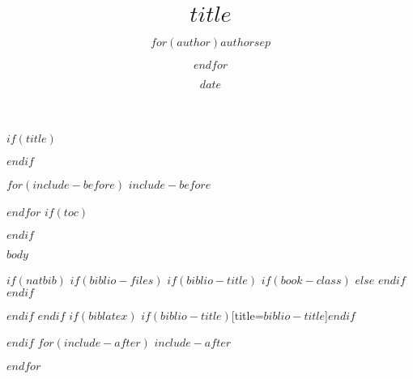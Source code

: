 \documentclass[fontsize=12pt,$if(fontsize)$$fontsize$,$endif$$if(lang)$$lang$,$endif$]{scrreprt}
\title{$title$}
\author{$for(author)$$author$$sep$ \and $endfor$}
\date{$date$}
\begin{document}
$if(title)$
\maketitle
$endif$

$for(include-before)$
$include-before$

$endfor$
$if(toc)$
{
\hypersetup{linkcolor=black}
\tableofcontents
\listoffigures 
\listoftables 
}
$endif$

\nocite{Barrie2007, Beer1998, Blyton2009, Boie2006,Brezina2008,Brezina2010,Brezina2010a}
\nocite{Collodi2010,Dietl2009,Dittert2012,Finsterbusch2012,Funke2008,Kinney2012,Klein2011}
\nocite{KNISTER1999,Leope2008,Lindgren1986,Maar2011,Masannek2003,Noestlinger2011,Noestlinger2010}
\nocite{Osborne2007,Pfister2011,Preussler2005,Preussler2005a,Rowling1998,Scheffler2011}
\nocite{Schneider2010,Schwarz2004,Siegner2002}

$body$

$if(natbib)$
$if(biblio-files)$
$if(biblio-title)$
$if(book-class)$
\renewcommand\bibname{$biblio-title$}
$else$
\renewcommand\refname{$biblio-title$}
$endif$
$endif$


$endif$
$endif$
$if(biblatex)$
\printbibliography$if(biblio-title)$[title=$biblio-title$]$endif$

$endif$
$for(include-after)$
$include-after$

$endfor$
\end{document}

